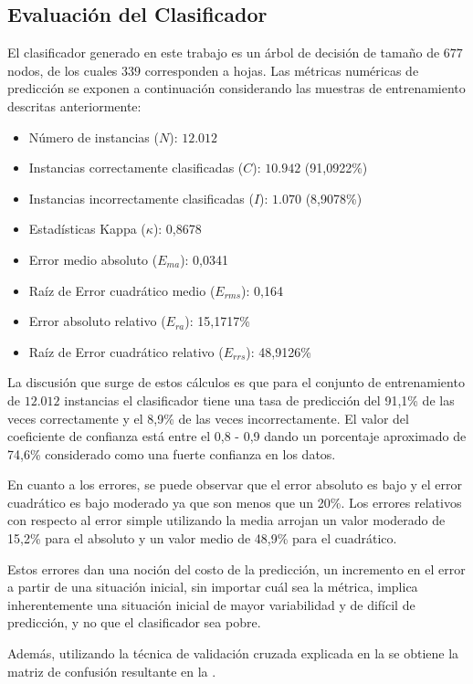 \subsection{Evaluación del Clasificador}

\label{ssec6:evaluacion}El clasificador generado en este trabajo
es un árbol de decisión de tamaño de $677$ nodos, de los cuales $339$
corresponden a hojas. Las métricas numéricas de predicción se exponen
a continuación considerando las muestras de entrenamiento descritas
anteriormente: 
\begin{itemize}
\item Número de instancias ($N$): $12.012$ 
\item Instancias correctamente clasificadas ($C$): $10.942$ (91,0922\%)
\item Instancias incorrectamente clasificadas ($I$): $1.070$ (8,9078\%)
\item Estadísticas Kappa ($\kappa$): 0,8678 
\item Error medio absoluto ($E_{ma}$): 0,0341
\item Raíz de Error cuadrático medio ($E_{rms}$): 0,164
\item Error absoluto relativo ($E_{ra}$): 15,1717\% 
\item Raíz de Error cuadrático relativo ($E_{rrs}$): 48,9126\%
\end{itemize}
La discusión que surge de estos cálculos es que para el conjunto de
entrenamiento de $12.012$ instancias el clasificador tiene una tasa
de predicción del 91,1\% de las veces correctamente y el 8,9\% de
las veces incorrectamente. El valor del coeficiente de confianza está
entre el 0,8 - 0,9 dando un porcentaje aproximado de 74,6\% considerado
como una fuerte confianza en los datos.

En cuanto a los errores, se puede observar que el error absoluto es
bajo y el error cuadrático es bajo moderado ya que son menos que un
20\%. Los errores relativos con respecto al error simple utilizando
la media arrojan un valor moderado de 15,2\% para el absoluto y un
valor medio de 48,9\% para el cuadrático. 

Estos errores dan una noción del costo de la predicción, un incremento
en el error a partir de una situación inicial, sin importar cuál sea
la métrica, implica inherentemente una situación inicial de mayor
variabilidad y de difícil de predicción, y no que el clasificador
sea pobre.

Además, utilizando la técnica de validación cruzada explicada en la
 se obtiene la matriz de confusión resultante
en la . 


